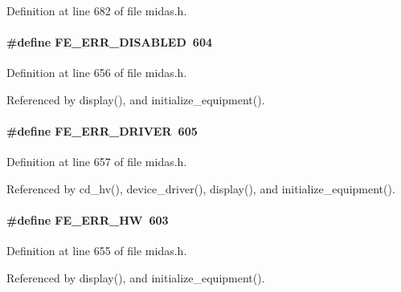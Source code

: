 Definition at line 682 of file midas.h.
\paragraph[{FE\_\-ERR\_\-DISABLED}]{\setlength{\rightskip}{0pt plus 5cm}\#define FE\_\-ERR\_\-DISABLED~604}\hfill\label{group__err26_gae7f0996583000c6c16916cdc846b753a}

\begin{DoxyItemize}
\item 
\end{DoxyItemize}

Definition at line 656 of file midas.h.

Referenced by display(), and initialize\_\-equipment().
\paragraph[{FE\_\-ERR\_\-DRIVER}]{\setlength{\rightskip}{0pt plus 5cm}\#define FE\_\-ERR\_\-DRIVER~605}\hfill\label{group__err26_gac4221d7e494c798f57552f502e2459ef}

\begin{DoxyItemize}
\item 
\end{DoxyItemize}

Definition at line 657 of file midas.h.

Referenced by cd\_\-hv(), device\_\-driver(), display(), and initialize\_\-equipment().
\paragraph[{FE\_\-ERR\_\-HW}]{\setlength{\rightskip}{0pt plus 5cm}\#define FE\_\-ERR\_\-HW~603}\hfill\label{group__err26_ga9fea053c26a278026fa0d7501c300c4f}

\begin{DoxyItemize}
\item 
\end{DoxyItemize}

Definition at line 655 of file midas.h.

Referenced by display(), and initialize\_\-equipment().
